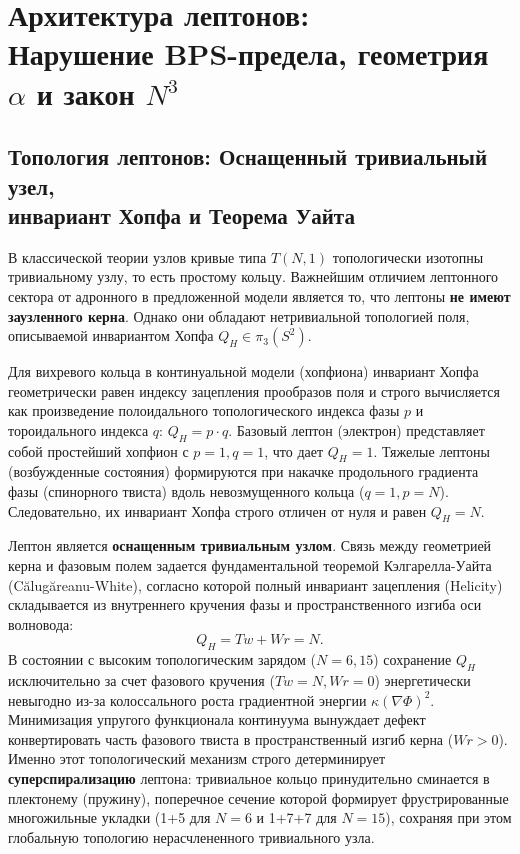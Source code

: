 \documentclass[11pt,a4paper]{article}
\begin{document}
\section{Архитектура лептонов:\\ Нарушение BPS-предела, геометрия $\alpha$ и закон $N^3$}
	
\subsection{Топология лептонов: Оснащенный тривиальный узел,\\ инвариант Хопфа и Теорема Уайта}
	В классической теории узлов кривые типа $T(N,1)$ топологически изотопны тривиальному узлу, то есть простому кольцу. Важнейшим отличием лептонного сектора от адронного в предложенной модели является то, что лептоны \textbf{не имеют заузленного керна}. Однако они обладают нетривиальной топологией поля, описываемой инвариантом Хопфа $Q_H \in \pi_3(S^2)$.
	
	Для вихревого кольца в континуальной модели (хопфиона) инвариант Хопфа геометрически равен индексу зацепления прообразов поля и строго вычисляется как произведение полоидального топологического индекса фазы $p$ и тороидального индекса $q$: $Q_H = p \cdot q$.
	Базовый лептон (электрон) представляет собой простейший хопфион с $p=1, q=1$, что дает $Q_H = 1$. Тяжелые лептоны (возбужденные состояния) формируются при накачке продольного градиента фазы (спинорного твиста) вдоль невозмущенного кольца ($q=1, p=N$). Следовательно, их инвариант Хопфа строго отличен от нуля и равен $Q_H = N$.
	
	Лептон является \textbf{оснащенным тривиальным узлом}. Связь между геометрией керна и фазовым полем задается фундаментальной теоремой Кэлгарелла-Уайта (Călugăreanu-White), согласно которой полный инвариант зацепления (Helicity) складывается из внутреннего кручения фазы и пространственного изгиба оси волновода:
	\begin{equation}
		Q_H = Tw + Wr = N.
	\end{equation}
	В состоянии с высоким топологическим зарядом ($N=6, 15$) сохранение $Q_H$ исключительно за счет фазового кручения ($Tw=N, Wr=0$) энергетически невыгодно из-за колоссального роста градиентной энергии $\kappa (\nabla \Phi)^2$. Минимизация упругого функционала континуума вынуждает дефект конвертировать часть фазового твиста в пространственный изгиб керна ($Wr > 0$).
	Именно этот топологический механизм строго детерминирует \textbf{суперспирализацию} лептона: тривиальное кольцо принудительно сминается в плектонему (пружину), поперечное сечение которой формирует фрустрированные многожильные укладки (1+5 для $N=6$ и 1+7+7 для $N=15$), сохраняя при этом глобальную топологию нерасчлененного тривиального узла.
	
\end{document}
